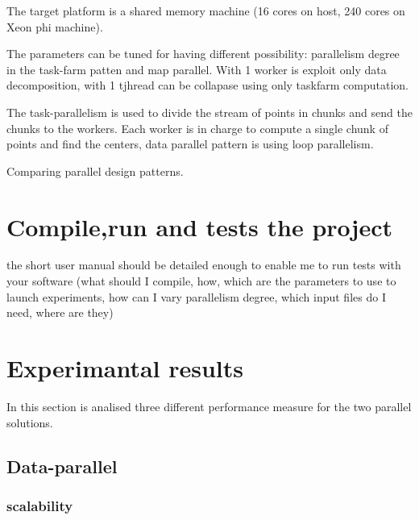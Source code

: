 \documentclass[12pt]{article}
\begin{document}
The target platform is a shared memory machine (16 cores on host, 240 cores on Xeon phi machine).

The parameters can be tuned for having different possibility:  parallelism degree in the task-farm patten and map parallel. With 1 worker is exploit only data decomposition, with 1 tjhread can be collapase using only taskfarm computation.


The task-parallelism is used to divide the stream of points in chunks and send the chunks to the workers. 
Each worker is in charge to compute a single chunk of points and find the centers, data parallel pattern is using loop parallelism.


Comparing parallel design patterns.



\section{Compile,run and tests the project}
the short user manual should be detailed enough to enable me to run tests with your software (what should I compile, how, which are the parameters to use to launch experiments, how can I vary parallelism degree, which input files do I need, where are they)

\section{Experimantal results}
In this section is analised three different performance measure for the two parallel solutions.

\subsection{Data-parallel}

\subsubsection*{scalability}




\end{document}
